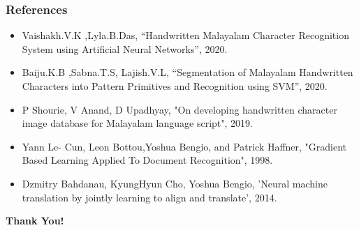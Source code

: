 \documentclass[aspectratio=169]{beamer}
\begin{document}
\begin{frame}
    \frametitle{References}
    \begin{itemize}
 \item Vaishakh.V.K ,Lyla.B.Das, “Handwritten Malayalam Character Recognition System using Artificial Neural Networks”, 2020.
 \item Baiju.K.B ,Sabna.T.S, Lajish.V.L, “Segmentation of Malayalam Handwritten Characters into Pattern Primitives and Recognition using SVM”, 2020.
 \item P Shourie, V Anand, D Upadhyay, "On developing handwritten character image database for Malayalam language script", 2019.
  \item Yann Le-
Cun, Leon Bottou,Yoshua Bengio, and Patrick Haffner, "Gradient Based Learning Applied To Document Recognition", 1998.
 \item Dzmitry Bahdanau, KyungHyun Cho, Yoshua Bengio, 'Neural machine translation by jointly learning to align and translate', 2014.
    \end{itemize}
\end{frame}

\begin{frame}
    \begin{center}
        \Large \textbf{Thank You!}
    \end{center}
\end{frame}
\end{document}

